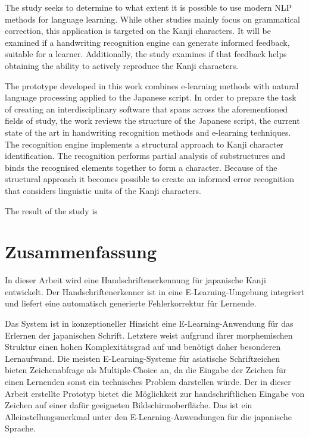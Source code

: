 The study seeks to determine to what extent it is possible to use modern NLP 
methods for language learning. While other studies mainly focus on grammatical
correction, this application is targeted on the Kanji characters. It will be 
examined if a handwriting recognition engine can generate informed feedback,
suitable for a learner. Additionally, the study examines if that feedback helps 
obtaining the ability to actively reproduce the Kanji characters.

The prototype developed in this work combines e-learning methods with natural
language processing applied to the Japanese script. In order to prepare the 
task of creating an interdisciplinary software that spans across the aforementioned 
fields of study, the work reviews the structure of the Japanese script, 
the current state of the art in handwriting recognition methods and e-learning 
techniques.
The recognition engine implements a structural approach to Kanji character 
identification. The recognition performs partial analysis of substructures
and binds the recognised elements together to form a character.
Because of the structural approach it becomes possible to create an informed
error recognition that considers linguistic units of the Kanji characters.

The result of the study is

\chapter*{Zusammenfassung}
\label{chap:zusammenfassung}

In dieser Arbeit wird eine Handschriftenerkennung für japanische Kanji 
entwickelt. Der Handschriftenerkenner ist in eine E-Learning-Umgebung integriert und
liefert eine automatisch generierte Fehlerkorrektur für Lernende.

Das System ist in konzeptioneller Hinsicht eine E-Learning-Anwendung für das 
Erlernen der japanischen Schrift. Letztere weist aufgrund ihrer morphemischen 
Struktur einen hohen Komplexitätsgrad auf und benötigt daher besonderen Lernaufwand.
Die meisten E-Learning-Systeme für asiatische Schriftzeichen bieten Zeichenabfrage
als Multiple-Choice an, da die Eingabe der Zeichen für einen Lernenden sonst 
ein technisches Problem darstellen würde.
Der in dieser Arbeit erstellte Prototyp bietet die Möglichkeit 
zur handschriftlichen Eingabe von Zeichen auf einer dafür geeigneten 
Bildschirmoberfläche. Das ist ein Alleinstellungsmerkmal unter den 
E-Learning-Anwendungen für die japanische Sprache.

